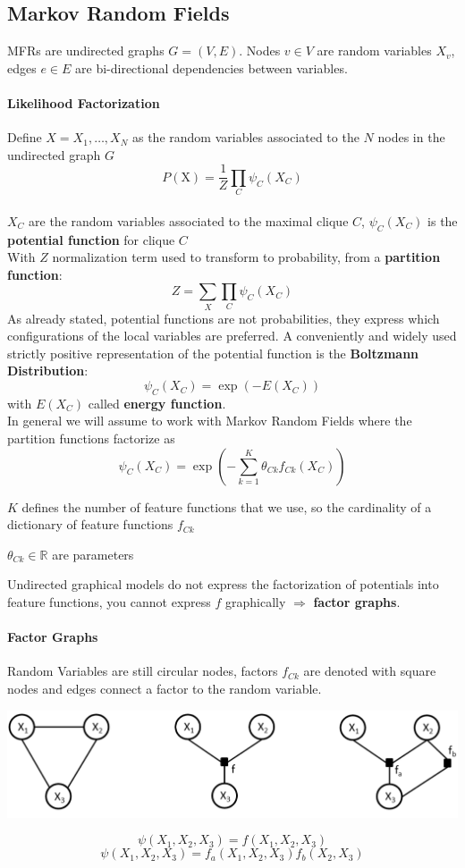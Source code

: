 \documentclass[10pt]{report}
\begin{document}
\subsection{Markov Random Fields}
MFRs are undirected graphs $G = (V, E)$. Nodes $v\in V$ are random variables $X_v$, edges $e\in E$ are bi-directional dependencies between variables.
\paragraph{Likelihood Factorization} Define $X = X_1,\ldots, X_N$ as the random variables associated to the $N$ nodes in the undirected graph $G$
$$P(\text{X}) = \frac{1}{Z}\prod_C \psi_C(X_C)$$\\
$X_C$ are the random variables associated to the maximal clique $C$, $\psi_C(X_C)$ is the \textbf{potential function} for clique $C$\\
With $Z$ normalization term used to transform to probability, from a \textbf{partition function}:
$$Z = \sum_X\prod_C\psi_C(X_C)$$
As already stated, potential functions are not probabilities, they express which configurations of the local variables are preferred. A conveniently and widely used strictly positive representation of the potential function is the \textbf{Boltzmann Distribution}:
$$\psi_C(X_C)=\exp\left(-E(X_C)\right)$$
with $E(X_C)$ called \textbf{energy function}.\\
In general we will assume to work with Markov Random Fields where the partition functions factorize as $$\psi_C(X_C) = \exp\left(-\sum_{k=1}^K\theta_{Ck}f_{Ck}(X_C)\right)$$
\begin{list}{}{}
	\item $K$ defines the number of feature functions that we use, so the cardinality of a dictionary of feature functions $f_{Ck}$
	\item $\theta_{Ck}\in\mathbb{R}$ are parameters
\end{list}
Undirected graphical models do not express the factorization of potentials into feature functions, you cannot express $f$ graphically $\Rightarrow$ \textbf{factor graphs}.
\paragraph{Factor Graphs} Random Variables are still circular nodes, factors $f_{Ck}$ are denoted with square nodes and edges connect a factor to the random variable.
\begin{center}
	\includegraphics[scale=0.5]{34.png}
\end{center}
$$\psi(X_1,X_2,X_3) = f(X_1,X_2,X_3)$$
$$\psi(X_1,X_2,X_3) = f_a(X_1,X_2,X_3)f_b(X_2,X_3)$$
\end{document}
